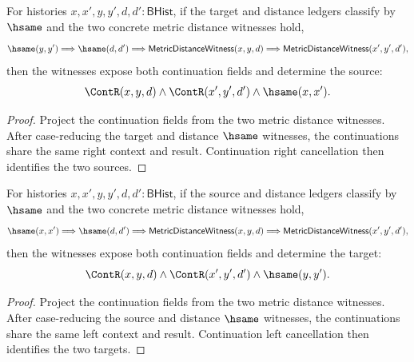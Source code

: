 \begin{theorem}
\label{thm:metric-distance-witness-hsame-source-deterministic}
For histories $x,x',y,y',d,d':\mathsf{BHist}$, if the target and distance
ledgers classify by $\hsame$ and the two concrete metric distance witnesses
hold,
$$
\hsame(y,y')\Longrightarrow
\hsame(d,d')\Longrightarrow
\mathsf{MetricDistanceWitness}(x,y,d)\Longrightarrow
\mathsf{MetricDistanceWitness}(x',y',d'),
$$
then the witnesses expose both continuation fields and determine the source:
$$
\ContR(x,y,d)\land \ContR(x',y',d')\land \hsame(x,x').
$$
\end{theorem}
\begin{proof}
Project the continuation fields from the two metric distance witnesses. After
case-reducing the target and distance $\hsame$ witnesses, the continuations
share the same right context and result. Continuation right cancellation then
identifies the two sources.
\end{proof}

\begin{theorem}
\label{thm:metric-distance-witness-hsame-target-deterministic}
For histories $x,x',y,y',d,d':\mathsf{BHist}$, if the source and distance
ledgers classify by $\hsame$ and the two concrete metric distance witnesses
hold,
$$
\hsame(x,x')\Longrightarrow
\hsame(d,d')\Longrightarrow
\mathsf{MetricDistanceWitness}(x,y,d)\Longrightarrow
\mathsf{MetricDistanceWitness}(x',y',d'),
$$
then the witnesses expose both continuation fields and determine the target:
$$
\ContR(x,y,d)\land \ContR(x',y',d')\land \hsame(y,y').
$$
\end{theorem}
\begin{proof}
Project the continuation fields from the two metric distance witnesses. After
case-reducing the source and distance $\hsame$ witnesses, the continuations
share the same left context and result. Continuation left cancellation then
identifies the two targets.
\end{proof}

